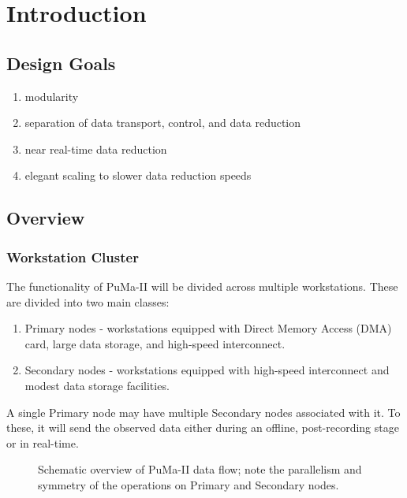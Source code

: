 
\chapter{Introduction}

\section{Design Goals}

\begin{enumerate}
\item modularity
\vspace{-2mm}
\item separation of data transport, control, and data reduction
\vspace{-2mm}
\item near real-time data reduction
\vspace{-2mm}
\item elegant scaling to slower data reduction speeds
\end{enumerate}

\section{Overview}

\subsection{Workstation Cluster}

The functionality of PuMa-II will be divided across multiple workstations.
These are divided into two main classes:

\begin{enumerate}

\item Primary nodes - workstations equipped with Direct Memory Access 
	(DMA) card, large data storage, and high-speed interconnect.

\item Secondary nodes - workstations equipped with high-speed interconnect
	and modest data storage facilities.

\end{enumerate}

A single Primary node may have multiple Secondary nodes associated
with it.  To these, it will send the observed data either during an
offline, post-recording stage or in real-time.

\begin{figure}
\centerline{}
\caption [\sffamily PuMa-II Data Flow]
{
Schematic overview of PuMa-II data flow; note the parallelism and 
symmetry of the operations on Primary and Secondary nodes.
}
\label{fig:layout}
\end{figure}

